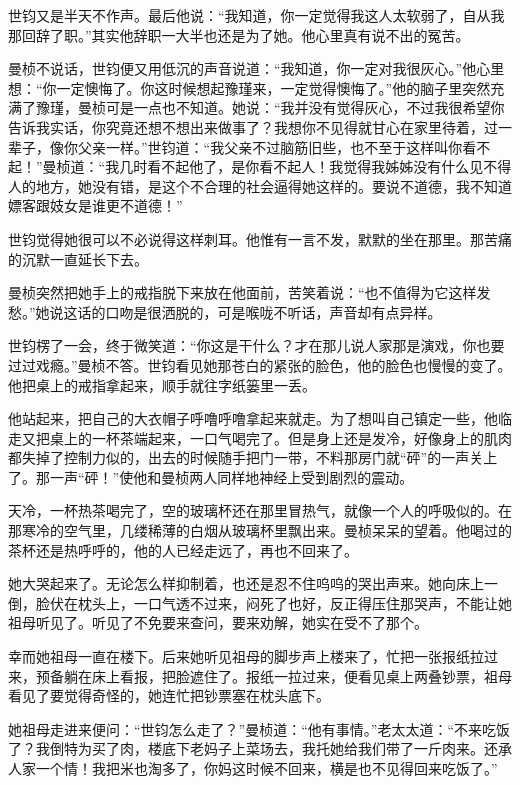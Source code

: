 \par 世钧又是半天不作声。最后他说：“我知道，你一定觉得我这人太软弱了，自从我那回辞了职。”其实他辞职一大半也还是为了她。他心里真有说不出的冤苦。
\par 曼桢不说话，世钧便又用低沉的声音说道：“我知道，你一定对我很灰心。”他心里想：“你一定懊悔了。你这时候想起豫瑾来，一定觉得懊悔了。”他的脑子里突然充满了豫瑾，曼桢可是一点也不知道。她说：“我并没有觉得灰心，不过我很希望你告诉我实话，你究竟还想不想出来做事了？我想你不见得就甘心在家里待着，过一辈子，像你父亲一样。”世钧道：“我父亲不过脑筋旧些，也不至于这样叫你看不起！”曼桢道：“我几时看不起他了，是你看不起人！我觉得我姊姊没有什么见不得人的地方，她没有错，是这个不合理的社会逼得她这样的。要说不道德，我不知道嫖客跟妓女是谁更不道德！”
\par 世钧觉得她很可以不必说得这样刺耳。他惟有一言不发，默默的坐在那里。那苦痛的沉默一直延长下去。
\par 曼桢突然把她手上的戒指脱下来放在他面前，苦笑着说：“也不值得为它这样发愁。”她说这话的口吻是很洒脱的，可是喉咙不听话，声音却有点异样。
\par 世钧楞了一会，终于微笑道：“你这是干什么？才在那儿说人家那是演戏，你也要过过戏瘾。”曼桢不答。世钧看见她那苍白的紧张的脸色，他的脸色也慢慢的变了。他把桌上的戒指拿起来，顺手就往字纸篓里一丢。
\par 他站起来，把自己的大衣帽子呼噜呼噜拿起来就走。为了想叫自己镇定一些，他临走又把桌上的一杯茶端起来，一口气喝完了。但是身上还是发冷，好像身上的肌肉都失掉了控制力似的，出去的时候随手把门一带，不料那房门就“砰”的一声关上了。那一声“砰！”使他和曼桢两人同样地神经上受到剧烈的震动。
\par 天冷，一杯热茶喝完了，空的玻璃杯还在那里冒热气，就像一个人的呼吸似的。在那寒冷的空气里，几缕稀薄的白烟从玻璃杯里飘出来。曼桢呆呆的望着。他喝过的茶杯还是热呼呼的，他的人已经走远了，再也不回来了。
\par 她大哭起来了。无论怎么样抑制着，也还是忍不住呜呜的哭出声来。她向床上一倒，脸伏在枕头上，一口气透不过来，闷死了也好，反正得压住那哭声，不能让她祖母听见了。听见了不免要来查问，要来劝解，她实在受不了那个。
\par 幸而她祖母一直在楼下。后来她听见祖母的脚步声上楼来了，忙把一张报纸拉过来，预备躺在床上看报，把脸遮住了。报纸一拉过来，便看见桌上两叠钞票，祖母看见了要觉得奇怪的，她连忙把钞票塞在枕头底下。
\par 她祖母走进来便问：“世钧怎么走了？”曼桢道：“他有事情。”老太太道：“不来吃饭了？我倒特为买了肉，楼底下老妈子上菜场去，我托她给我们带了一斤肉来。还承人家一个情！我把米也淘多了，你妈这时候不回来，横是也不见得回来吃饭了。”
